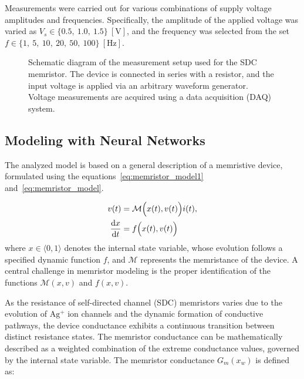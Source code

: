 \documentclass[11pt, oneside]{article}
\newcommand{\der}{{\rm d}}
\newcommand{\M}{\mathcal{M}}
\newcommand{\ua}{v}
\newcommand{\ia}{i}
\newcommand{\xw}{x}
\begin{document}
Measurements were carried out for various combinations of supply voltage amplitudes and frequencies. Specifically, the amplitude of the applied voltage was varied as $V_s \in \{0.5,\ 1.0,\ 1.5\}~\mathrm{[V]}$, and the frequency was selected from the set $f \in \{1,\ 5,\ 10,\ 20,\ 50,\ 100\}~\mathrm{[Hz]}$.


\begin{figure}[H]
    \centering
    \resizebox{0.5\linewidth}{!}{%
        }
    \vspace{-0.5in}
    \caption{Schematic diagram of the measurement setup used for the SDC memristor. The device is connected in series with a resistor, and the input voltage is applied via an arbitrary waveform generator. Voltage measurements are acquired using a data acquisition (DAQ) system.}
    \label{fig:memristor_setup}
\end{figure}

\subsection{Modeling with Neural Networks}
The analyzed model is based on a general description of a memristive device, formulated using the equations~\eqref{eq:memristor_model1} and~\eqref{eq:memristor_model}.

\begin{align}
    \label{eq:memristor_model1}
    \ua(t)                  & = \M \Big(\xw(t),\ua(t)\Big) \ia(t), \\
    \label{eq:memristor_model}
    \frac{\der \xw}{\der t} & = f\Big(\xw(t),\ua(t)\Big)
\end{align}
where $\xw \in \langle 0, 1 \rangle$ denotes the internal state variable, whose evolution follows a specified dynamic function $f$, and $\M$ represents the memristance of the device. A central challenge in memristor modeling is the proper identification of the functions $\M(\xw, \ua)$ and $f(\xw, \ua)$.



As the resistance of self-directed channel (SDC) memristors varies due to the evolution of $\mathrm{Ag^+}$ ion channels and the dynamic formation of conductive pathways, the device conductance exhibits a continuous transition between distinct resistance states. The memristor conductance can be mathematically described as a weighted combination of the extreme conductance values, governed by the internal state variable.
The memristor conductance $G_m(x_w)$ is defined as:
\end{document}
